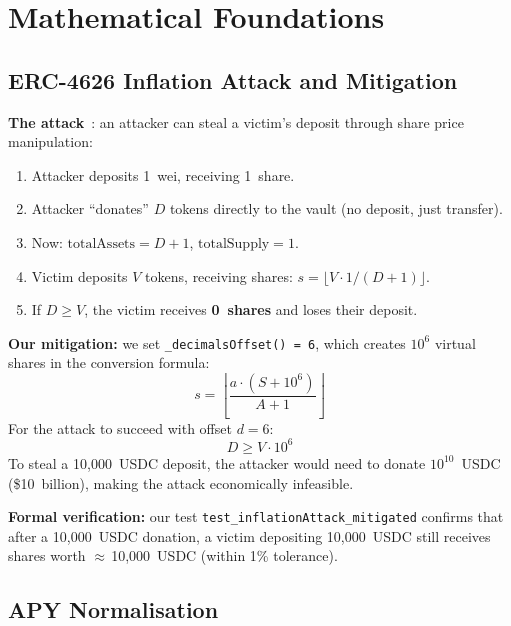 \documentclass[12pt]{article}
\begin{document}
\section{Mathematical Foundations}

\subsection{ERC-4626 Inflation Attack and Mitigation}
\label{sec:inflation}

\textbf{The attack}~\cite{oz-inflation}: an attacker can steal a victim's deposit through share price manipulation:
\begin{enumerate}[nosep]
  \item Attacker deposits 1~wei, receiving 1~share.
  \item Attacker ``donates'' $D$ tokens directly to the vault (no deposit, just transfer).
  \item Now: $\text{totalAssets} = D + 1$, $\text{totalSupply} = 1$.
  \item Victim deposits $V$ tokens, receiving shares: $s = \lfloor V \cdot 1 / (D + 1) \rfloor$.
  \item If $D \geq V$, the victim receives \textbf{0~shares} and loses their deposit.
\end{enumerate}

\textbf{Our mitigation:} we set \texttt{\_decimalsOffset() = 6}, which creates $10^6$ virtual shares in the conversion formula:
\begin{equation}
  s = \left\lfloor \frac{a \cdot (S + 10^6)}{A + 1} \right\rfloor
  \label{eq:virtual-shares}
\end{equation}
For the attack to succeed with offset $d = 6$:
\begin{equation}
  D \geq V \cdot 10^6
  \label{eq:attack-cost}
\end{equation}
To steal a 10{,}000~USDC deposit, the attacker would need to donate $10^{10}$~USDC (\$10~billion), making the attack economically infeasible.

\textbf{Formal verification:} our test \texttt{test\_inflationAttack\_mitigated} confirms that after a 10{,}000~USDC donation, a victim depositing 10{,}000~USDC still receives shares worth $\approx$\,10{,}000~USDC (within 1\% tolerance).

\subsection{APY Normalisation}
\end{document}
